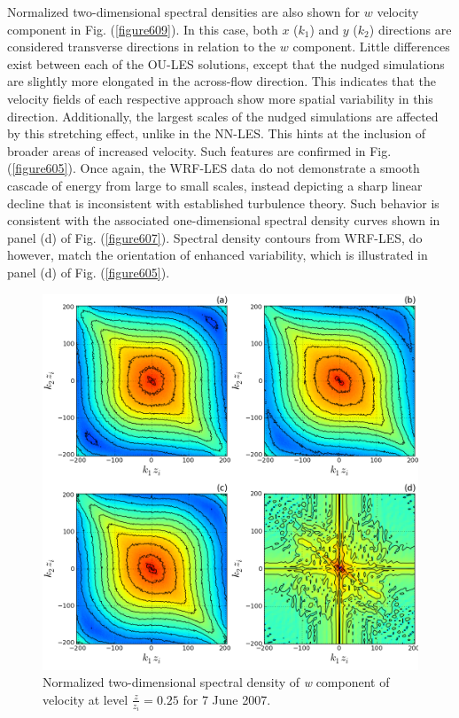 Normalized two-dimensional spectral densities are also shown for $w$ velocity component in Fig. (\autoref{figure609}). In this case, both $x$ ($k_1$) and $y$ ($k_2$) directions are considered transverse directions in relation to the $w$ component. Little differences exist between each of the OU-LES solutions, except that the nudged simulations are slightly more elongated in the across-flow direction. This indicates that the velocity fields of each respective approach show more spatial variability in this direction. Additionally, the largest scales of the nudged simulations are affected by this stretching effect, unlike in the NN-LES. This hints at the inclusion of broader areas of increased velocity. Such features are confirmed in Fig. (\autoref{figure605}). Once again, the WRF-LES data do not demonstrate a smooth cascade of energy from large to small scales, instead depicting a sharp linear decline that is inconsistent with established turbulence theory. Such behavior is consistent with the associated one-dimensional spectral density curves shown in panel (d) of Fig. (\autoref{figure607}). Spectral density contours from WRF-LES, do however, match the orientation of enhanced variability, which is illustrated in panel (d) of Fig. (\autoref{figure605}).


\begin{figure}[H]
\begin{center}
\includegraphics[width=\textwidth]{figures/chapter6/spectra2D_w_20070607}
\end{center}
\caption{Normalized two-dimensional spectral density of \textit{w} component of velocity at level $\frac{z}{z_i}=0.25$ for 7 June 2007.}
\label{figure609}
\end{figure}


